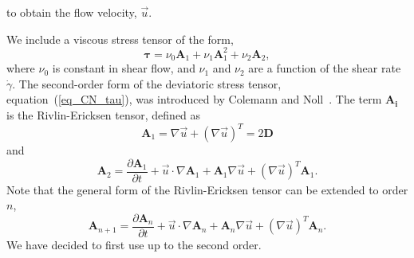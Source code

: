 to obtain the flow velocity, $\vec{u}$.

We include a viscous stress tensor of the form,
\begin{equation}
   \boldsymbol{\tau} = 
    \nu_0  \bm{A}_1 +  \nu_1  \bm{A}_1^2 + \nu_2 \bm{A}_2,
   \label{eq_CN_tau}
\end{equation}
where $\nu_0$ is constant in shear flow, and $\nu_1$ and $\nu_2$ are a function of the shear rate $\dot{\gamma}$.
The second-order form of the deviatoric stress tensor, equation~(\ref{eq_CN_tau}), was introduced by Colemann and Noll~\cite{coleman_approximation_1960}.
The term $\bm{A_i}$ is the Rivlin-Ericksen tensor, defined as
\begin{equation}
   {\bm A_1}  = \nabla \vec{u} +  \left( \nabla \vec{u} \right)^T = 2 \bm{D} 
\end{equation}
and 
\begin{equation}
   \boldsymbol{A}_2
   =\frac{\partial \boldsymbol{A}_1}{\partial t} + \vec{u} \cdot \nabla \boldsymbol{A}_1+\boldsymbol{A}_1 \nabla \vec{u}+ \left(\nabla \vec{u} \right)^T \boldsymbol{A}_1.
\end{equation}
Note that the general form of the Rivlin-Ericksen tensor can be extended to order $n$,  
\begin{equation}
  \boldsymbol{A}_{n+1}
  =\frac{\partial \boldsymbol{A}_{n}}{\partial t} + \vec{u} \cdot \nabla \boldsymbol{A}_n+\boldsymbol{A}_n \nabla \vec{u}+ \left(\nabla \vec{u} \right)^T \boldsymbol{A}_n.
\end{equation}
We have decided to first use up to the second order.
\par

